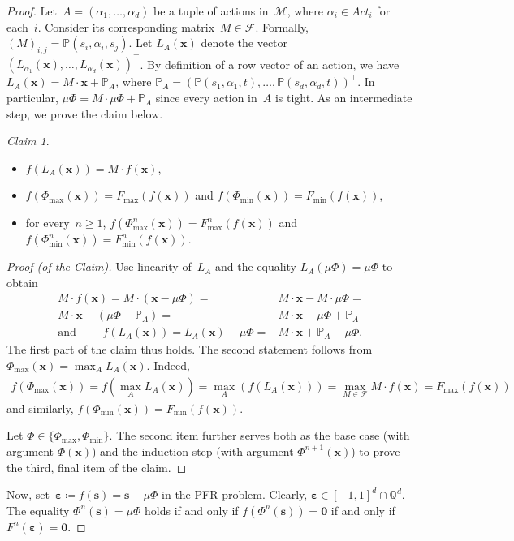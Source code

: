 \documentclass[preprint,12pt]{elsarticle}
\theoremstyle{plain}
\theoremstyle{definition}
\theoremstyle{remark}
\theoremstyle{claimstyle}
\newtheorem*{claim*}{Claim}
\newcommand{\mdp}{\mathcal{M}}
\newcommand{\prob}{\mathbb{P}}
\newcommand{\QQ}{\mathbb{Q}}
\newcommand{\eps}{\bm{\varepsilon}}
\begin{document}
\begin{proof}
Let~$A = (\alpha_1, \dots, \alpha_d)$ be a tuple of actions in~$\mdp$, where $\alpha_i \in Act_i$ for each~$i$.
Consider its corresponding matrix~$M \in \mathcal{F}$.
Formally, $(M)_{i,j} = \prob(s_i, \alpha_i, s_j)$.
Let $L_A(\bm{x})$ denote the vector $\left(L_{\alpha_1}(\bm{x}), \dots, L_{\alpha_d}(\bm{x})\right)^\top$.
By definition of a row vector of an action, we have
$L_A(\bm{x}) = M \cdot \bm{x} +  \prob_A$, where $\prob_A = \left(\prob(s_1, \alpha_1, t), \dots, \prob(s_d, \alpha_d, t) \right)^\top$. 
In particular, $\mu\Phi = M \cdot \mu\Phi + \prob_A$ since every action in~$A$ is tight.
As an intermediate step, we prove the claim below.
\begin{claim*}\label{eps-facts}
	\begin{itemize}The following equalities hold for every~$\bm{x} \in U_\delta(\bm{t})$:
		\item $f(L_A(\bm{x})) = M \cdot f(\bm{x})$,
		\item $f(\Phi_{\max}(\bm{x})) = F_{\max}(f(\bm{x}))$ and $f(\Phi_{\min}(\bm{x})) = F_{\min}(f(\bm{x}))$,
		\item for every~$n \geq 1$, $f(\Phi_{\max}^n(\bm{x})) = F_{\max}^n(f(\bm{x}))$ and $f(\Phi_{\min}^n(\bm{x})) = F_{\min}^n(f(\bm{x}))$.
	\end{itemize}
\end{claim*}
\begin{proof}[Proof (of the Claim)]
	Use linearity of~$L_A$ and the equality $L_A(\mu\Phi) = \mu\Phi$ to obtain
	\begin{align*}M \cdot f(\bm{x}) = M \cdot \left(\bm{x} - \mu\Phi\right) = &M \cdot \bm{x} - M \cdot \mu\Phi =\\ M \cdot \bm{x} - (\mu\Phi - \prob_A) =&  M \cdot \bm{x} -
		\mu\Phi + \prob_A\\
		\text{and } \qquad f(L_A(\bm{x})) = L_A(\bm{x}) - \mu\Phi =&
		M \cdot \bm{x} + \prob_A - \mu\Phi.	
	\end{align*}
	The first part of the claim thus holds.
	The second statement follows from $\Phi_{\max}(\bm{x}) = \max_A L_A(\bm{x})$.
	Indeed, \begin{align*}
		f(\Phi_{\max}(\bm{x})) = f(\max_A L_A(\bm{x})) = \max_A (f(L_A(\bm{x}))) = \max_{M \in \mathcal{F}} M \cdot f(\bm{x}) = F_{\max}(f(\bm{x}))
	\end{align*}
and similarly, $f(\Phi_{\min}(\bm{x}))= F_{\min}(f(\bm{x}))$.
	
	Let $\Phi \in \{\Phi_{\max},\Phi_{\min}\}$. 
	The second item further serves both as the base case (with  argument $\Phi(\bm{x})$) 
	and the induction step (with argument $\Phi^{n+1}(\bm{x})$) to prove the third, final item of the claim.
\end{proof}
Now, set~$\eps\coloneqq f(\bm{s}) = \bm{s} - \mu\Phi$ in the PFR problem. Clearly, $\eps \in [-1, 1]^d \cap \QQ^d$.
The equality $\Phi^n(\bm{s}) = \mu\Phi$ holds if and only if $f(\Phi^n(\bm{s})) = \bm{0}$ if and only if $F^n(\eps) = \bm{0}$.
\end{proof}
\end{document}
